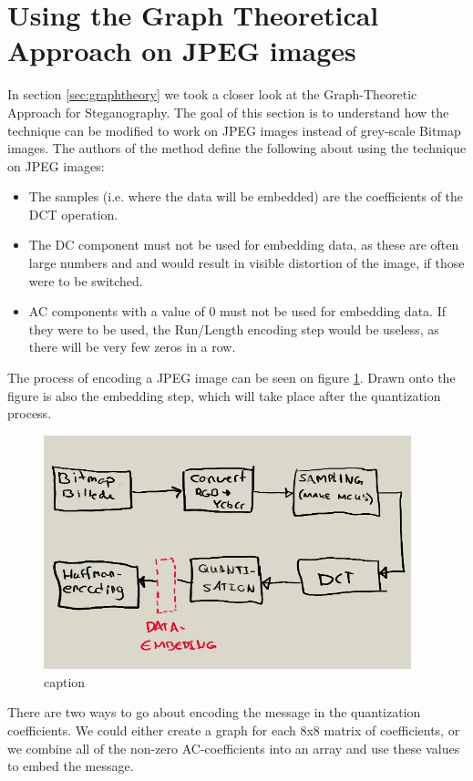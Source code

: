 \section{Using the Graph Theoretical Approach on JPEG images}
In section \ref{sec:graphtheory} we took a closer look at the Graph-Theoretic Approach for Steganography. The goal of this section is to understand how the technique can be modified to work on JPEG images instead of grey-scale Bitmap images. The authors of the method define the following about using the technique on JPEG images\cite{hetzl_2005}:

\begin{itemize}
	\item The samples (i.e. where the data will be embedded) are the coefficients of the DCT operation. 
	\item The DC component must not be used for embedding data, as these are often large numbers and and would result in visible distortion of the image, if those were to be switched.
	\item AC components with a value of 0 must not be used for embedding data. If they were to be used, the Run/Length encoding step would be useless, as there will be very few zeros in a row.
\end{itemize}

The process of encoding a JPEG image can be seen on figure \ref{fig:JPEGprocess}. Drawn onto the figure is also the embedding step, which will take place after the quantization process.

\begin{figure}[h!]
	\centering
	\includegraphics[width=0.95\textwidth]{figures/JPEGprocess.png}
	\caption{caption}
	\label{fig:JPEGprocess}
\end{figure}

There are two ways to go about encoding the message in the quantization coefficients. We could either create a graph for each 8x8 matrix of coefficients, or we combine all of the non-zero AC-coefficients into an array and use these values to embed the message.